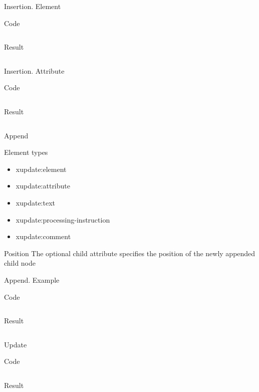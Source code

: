 \documentclass[sans]{beamer}
\begin{document}
\begin{frame}{Insertion. Element}
	\begin{block}{Code}
		\inputminted[fontsize=\footnotesize]{xml}{codes/ex10.xml}
	\end{block}
	\begin{block}{Result}
		\inputminted[fontsize=\footnotesize]{xml}{codes/ex11.xml}
	\end{block}
\end{frame}

\begin{frame}{Insertion. Attribute}
	\begin{block}{Code}
		\inputminted[fontsize=\tiny]{xml}{codes/ex12.xml}
	\end{block}
	\begin{block}{Result}
		\inputminted[fontsize=\footnotesize]{xml}{codes/ex13.xml}
	\end{block}
\end{frame}


\begin{frame}{Append}
	\begin{block}{Element types}
	\begin{itemize}
		\item xupdate:element
		\item xupdate:attribute
		\item xupdate:text
		\item xupdate:processing-instruction
		\item xupdate:comment
	\end{itemize}
	\end{block}

	\begin{block}{Position}
		The optional child attribute specifies the position of the newly appended child node
	\end{block}
\end{frame}

\begin{frame}{Append. Example}
	\begin{block}{Code}
		\inputminted[fontsize=\footnotesize]{xml}{codes/ex14.xml}
	\end{block}
	\begin{block}{Result}
		\inputminted[fontsize=\footnotesize]{xml}{codes/ex15.xml}
	\end{block}	
\end{frame}

\begin{frame}{Update}
	\begin{block}{Code}
		\inputminted[fontsize=\footnotesize]{xml}{codes/ex16.xml}
	\end{block}
	\begin{block}{Result}
		\inputminted[fontsize=\footnotesize]{xml}{codes/ex17.xml}
	\end{block}
\end{frame}
\end{document}
